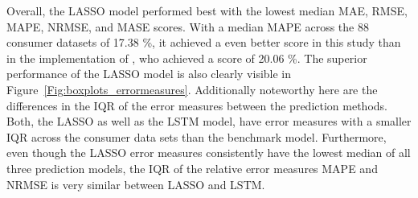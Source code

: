 Overall, the LASSO model performed best with the lowest median MAE, RMSE, MAPE, NRMSE, and MASE scores. With a median MAPE across the 88 consumer datasets of 17.38 \%, it achieved a even better score in this study than in the implementation of \citet{Li:2017}, who achieved a score of 20.06 \%. The superior performance of the LASSO model is also clearly visible in Figure~\ref{Fig:boxplots_errormeasures}. Additionally noteworthy here are the differences in the IQR of the error measures between the prediction methods. Both, the LASSO as well as the LSTM model, have error measures with a smaller IQR across the consumer data sets than the benchmark model. Furthermore, even though the LASSO error measures consistently have the lowest median of all three prediction models, the IQR of the relative error measures MAPE and NRMSE is very similar between LASSO and LSTM.
%
